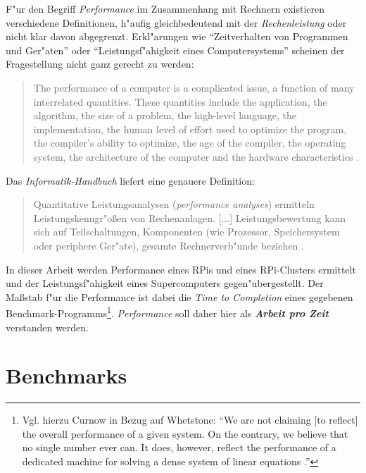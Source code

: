 F"ur den Begriff \textit{Performance} im Zusammenhang mit Rechnern existieren verschiedene Definitionen, h"aufig gleichbedeutend mit der \textit{Rechenleistung} oder nicht klar davon abgegrenzt. Erkl"arungen wie "`Zeitverhalten von Programmen und Ger"aten"' oder "`Leistungsf"ahigkeit eines Computersystems"' scheinen der Fragestellung nicht ganz gerecht zu werden: 
\begin{quote}
\onehalfspacing
The performance of a computer is a complicated issue, a function of many interrelated quantities. These quantities include the application, the algorithm, the size of a problem, the high-level language, the implementation, the human level of effort used to optimize the program, the compiler's ability to optimize, the age of the compiler, the operating system, the architecture of the computer and the hardware characteristics \cite{don03}.
\end{quote}
Das \textit{Informatik-Handbuch} liefert eine genauere Definition:
\begin{quote} 
\onehalfspacing
Quantitative Leistungsanalysen (\textit{performance analyses}) ermitteln Leistungskenngr"o\ss en von Rechenanlagen. [...] Leistungsbewertung kann sich auf Teilschaltungen, Komponenten (wie Prozessor, Speichersystem oder periphere Ger"ate), gesamte Rechnerverb"unde beziehen \cite{rec06}.
\end{quote}
In dieser Arbeit werden Performance eines RPis und eines RPi-Clusters ermittelt und der Leistungsf"ahigkeit eines Supercomputers gegen"ubergestellt. Der Ma\ss stab f"ur die Performance ist dabei die \textit{Time to Completion} eines gegebenen Benchmark-Programms\footnote{Vgl. hierzu Curnow in Bezug auf Whetstone: "`We are not claiming [to reflect] the overall performance of a given system. On the contrary, we believe that no single number ever can. It does, however, reflect the performance of a dedicated machine for solving a dense system of linear equations \cite{cur76}."'}. \textit{Performance} soll daher hier als \textbf{\textit{Arbeit pro Zeit}} verstanden werden. 

\section{Benchmarks}\label{Benchmarks}

